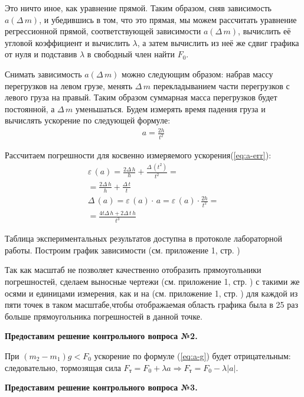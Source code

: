 \documentclass[a4paper,12pt]{report}
\begin{document}
Это ничто иное, как уравнение прямой. Таким образом, сняв зависимость $a(\Delta\,m)$, и убедившись в том, что это прямая, мы можем рассчитать уравнение регрессионной прямой, соответствующей зависимости $a(\Delta\,m)$, вычислить её угловой коэффициент и вычислить $\lambda$, а затем вычислить из неё же сдвиг графика от нуля и подставив $\lambda$  в свободный член найти $F_0$.

Снимать зависимость $a(\Delta\,m)$ можно следующим образом: набрав массу перегрузков на левом грузе, менять $\Delta\,m$ перекладыванием части перегрузков с левого груза на правый. Таким образом суммарная масса перегрузков будет постоянной, а $\Delta\,m$ уменьшаться. Будем измерять время падения груза и вычислять ускорение по следующей формуле:
\begin{gather}
	\label{eq:a-h}
	a=\frac{2h}{t^2}
\end{gather}

Рассчитаем погрешности для косвенно измеряемого ускорения(\ref{eq:a-err}):
\begin{gather}
	\label{eq:a-err}
	\varepsilon\,(a)=\frac{2\Delta\,h}{h}+\frac{\Delta\,(t^2)}{t^2}=\\
	=\frac{2\Delta\,h}{h}+\frac{\Delta\,t}{t}\\
	\Delta\,(a)=\varepsilon\,(a)\cdot\,a=\varepsilon\,(a)\cdot\frac{2h}{t^2}=\\
	=\frac{4t\Delta\,h+2\Delta\,t\,h}{t^3}
\end{gather}

Таблица экспериментальных результатов доступна в протоколе лабораторной работы. Построим график зависимости (см. приложение 1, стр. \pageref{fig:a-m})

Так как масштаб не позволяет качественно отобразить прямоугольники погрешностей, сделаем выносные чертежи (см. приложение 1, стр. \pageref{fig:a-m-2}) с такими же осями и единицами измерения, как и на (см. приложение 1, стр. \pageref{fig:a-m}) для каждой из пяти точек в таком масштабе,чтобы отображаемая область графика была в 25 раз больше прямоугольника погрешностей в данной точке.

\textbf{Предоставим решение контрольного вопроса №2.}

При $(m_2-m_1)g<F_0$ ускорение по формуле (\ref{eq:a-g}) будет отрицательным: следовательно, тормозящая сила $F_\text{т}=F_0+\lambda{a}\Longrightarrow F_\text{т}=F_0-\lambda{|a|}$.

\textbf{Предоставим решение контрольного вопроса №3.}
\end{document}
